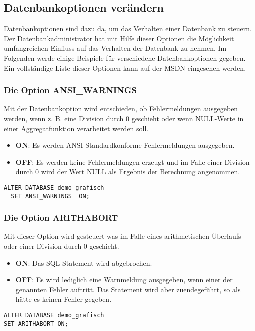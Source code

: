       \subsection{Datenbankoptionen verändern}
        Datenbankoptionen sind dazu da, um das Verhalten einer Datenbank zu
        steuern. Der Datenbankadministrator hat mit Hilfe dieser Optionen die
        Möglichkeit umfangreichen Einfluss auf das Verhalten der Datenbank zu
        nehmen. Im Folgenden werde einige Beispiele f\"ur verschiedene
        Datenbankoptionen gegeben. Ein vollständige Liste dieser Optionen kann
        auf der MSDN eingesehen werden.
        \begin{literaturinternet}
          \item \cite{bb522682}
        \end{literaturinternet}
        \subsubsection{Die Option ANSI\_WARNINGS}
          Mit der Datenbankoption  wird entschieden,
          ob Fehlermeldungen ausgegeben werden, wenn z. B. eine Division durch 0
          geschieht oder wenn NULL-Werte in einer Aggregatfunktion verarbeitet
          werden soll.
          \begin{itemize}
              \item \textbf{ON}: Es werden ANSI-Standardkonforme Fehlermeldungen
              ausgegeben.
              \item \textbf{OFF}: Es werden keine Fehlermeldungen erzeugt und im
              Falle einer Division durch 0 wird der Wert NULL als Ergebnis der
              Berechnung angenommen.
          \end{itemize}
          \begin{lstlisting}[language=ms_sql,caption={ANSI-Standardkonforme
            Warnmeldungen ausgeben},label=admin03_15]
  ALTER DATABASE demo_grafisch
  SET ANSI_WARNINGS  ON;
            \end{lstlisting}
        \subsubsection{Die Option ARITHABORT}
          Mit dieser Option wird gesteuert was im Falle eines arithmetischen
          Überlaufs oder einer Division durch 0 geschieht.
\clearpage
          \begin{itemize}
              \item \textbf{ON}: Das SQL-Statement wird abgebrochen.
              \item \textbf{OFF}: Es wird lediglich eine Warnmeldung ausgegeben,
              wenn einer der genannten Fehler auftritt. Das Statement wird aber
              zuendegeführt, so als hätte es keinen Fehler gegeben.
          \end{itemize}
          \begin{lstlisting}[language=ms_sql,caption={Arithmetische
          Überläufe und Divisionen durch 0 kontrollieren},label=admin03_16]
ALTER DATABASE demo_grafisch 
SET ARITHABORT ON;
          \end{lstlisting}
